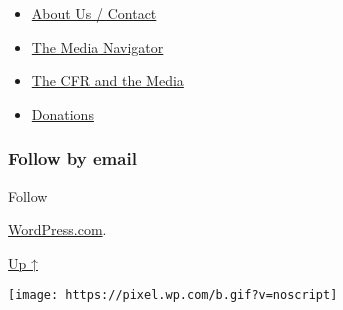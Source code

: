 \begin{itemize}
\tightlist
\item
  \href{https://swprs.org/contact/}{About Us / Contact}
\item
  \href{https://swprs.org/media-navigator/}{The Media Navigator}
\item
  \href{https://swprs.org/the-american-empire-and-its-media/}{The CFR
  and the Media}
\item
  \href{https://swprs.org/donations/}{Donations}
\end{itemize}

\hypertarget{follow-by-email}{%
\subsubsection{Follow by email}\label{follow-by-email}}

Follow

\href{https://wordpress.com/?ref=footer_custom_com}{WordPress.com}.

\protect\hyperlink{}{Up ↑}

\texttt{[image: https://pixel.wp.com/b.gif?v=noscript]}

